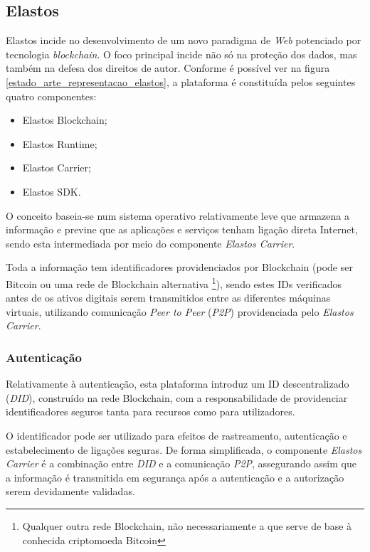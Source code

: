 \subsection{Elastos}
Elastos incide no desenvolvimento de um novo paradigma de \emph{Web} potenciado por tecnologia \emph{blockchain}\cite{a_bit_about_blockchain}. O foco principal incide não só na proteção dos dados, mas também na defesa dos direitos de autor. Conforme é possível ver na figura \ref{estado_arte_representacao_elastos}, a plataforma é constituída pelos seguintes quatro componentes:\cite{elastos_white_paper}
\begin{itemize}
	\item Elastos Blockchain;
	\item Elastos Runtime;
	\item Elastos Carrier;
	\item Elastos SDK.
\end{itemize}

O conceito baseia-se num sistema operativo relativamente leve que armazena a informação e previne que as aplicações e serviços tenham ligação direta Internet, sendo esta intermediada por meio do componente \emph{Elastos Carrier}. 

Toda a informação tem identificadores providenciados por Blockchain (pode ser Bitcoin ou uma rede de Blockchain alternativa \footnote{Qualquer outra rede Blockchain, não necessariamente a que serve de base à conhecida criptomoeda Bitcoin}), sendo estes IDs verificados antes de os ativos digitais serem transmitidos entre as diferentes máquinas virtuais, utilizando comunicação \emph{Peer to Peer} (\emph{P2P\label{sym:P2P}})\cite{what_are_P2P_networks} providenciada pelo \emph{Elastos Carrier}\cite{elastos_developer}.

\subsubsection{Autenticação}

Relativamente à autenticação, esta plataforma introduz um ID descentralizado (\emph{DID}\label{sym:DID}), construído na rede Blockchain, com a responsabilidade de providenciar identificadores seguros tanta para recursos como para utilizadores.

O identificador pode ser utilizado para efeitos de rastreamento, autenticação e estabelecimento de ligações seguras. De forma simplificada, o componente \emph{Elastos Carrier} é a combinação entre \emph{DID} e a comunicação \emph{P2P}, assegurando assim que a informação é transmitida em segurança após a autenticação e a autorização serem devidamente validadas\cite{elastos_white_paper}.

